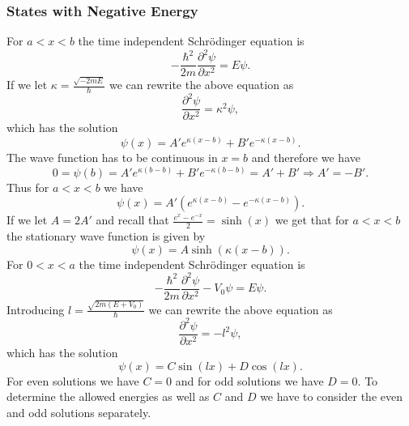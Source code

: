 \documentclass[12pt,a4paper]{article}
\newcommand{\pdiffn}[3]{\frac{\partial^{#3} #1}{\partial #2^{#3}}}
\begin{document}
\subsubsection{States with Negative Energy}
For $a < x < b$ the time independent Schrödinger equation is
\begin{equation}
- \frac{\hbar^2}{2 m} \pdiffn{\psi}{x}{2} = E \psi.
\end{equation}
If we let $\kappa = \frac{\sqrt{- 2 m E}}{\hbar}$ we can rewrite the above equation as
\begin{equation}
\pdiffn{\psi}{x}{2} = \kappa^2 \psi,
\end{equation}
which has the solution
\begin{equation}
\psi(x) = A' e^{\kappa (x - b)} + B' e^{- \kappa (x - b)}.
\end{equation}
The wave function has to be continuous in $x = b$ and therefore we have
\begin{equation}
0 = \psi(b) =  A' e^{\kappa (b - b)} + B' e^{- \kappa (b - b)} = A' + B' \Rightarrow A' = - B'.
\end{equation}
Thus for $a < x < b$ we have
\begin{equation}
\psi(x) = A' \left(e^{\kappa (x - b)} - e^{- \kappa (x - b)} \right).
\end{equation}
If we let $A = 2 A'$ and recall that $\frac{e^x - e^{-x}}{2} = \sinh(x)$ we get that for $a < x < b$ the stationary wave function is given by
\begin{equation}
\psi(x) = A \sinh \left(\kappa (x - b) \right).
\end{equation}
For $0 < x < a$ the time independent Schrödinger equation is
\begin{equation}
- \frac{\hbar^2}{2 m} \pdiffn{\psi}{x}{2} - V_0 \psi = E \psi.
\end{equation}
Introducing $l = \frac{\sqrt{2 m (E + V_0)}}{\hbar}$ we can rewrite the above equation as
\begin{equation}
\pdiffn{\psi}{x}{2} = -l^2 \psi,
\end{equation}
which has the solution
\begin{equation}
\psi(x) = C \sin(l x) + D \cos(l x).
\end{equation}
For even solutions we have $C = 0$ and for odd solutions we have $D = 0$. To determine the allowed energies as well as $C$ and $D$ we have to consider the even and odd solutions separately.
\end{document}
